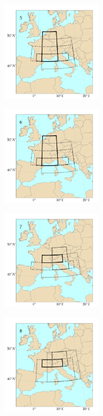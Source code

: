 \documentclass[5p]{elsarticle}
\begin{document}
\begin{figure}[htb]
\begin{subfigure}{.5\columnwidth}
	\end{subfigure}
	\begin{subfigure}{.5\columnwidth}
		\centering
		\includegraphics[width=4.2cm]{figures/spatial_win_z4/Spatial_windows_5.png}
	\end{subfigure}%
	\begin{subfigure}{.5\columnwidth}
		\centering
		\includegraphics[width=4.2cm]{figures/spatial_win_z4/Spatial_windows_6.png}
	\end{subfigure}
	\begin{subfigure}{.5\columnwidth}
		\centering
		\includegraphics[width=4.2cm]{figures/spatial_win_z4/Spatial_windows_7.png}
	\end{subfigure}%
	\begin{subfigure}{.5\columnwidth}
		\centering
		\includegraphics[width=4.2cm]{figures/spatial_win_z4/Spatial_windows_8.png}

\end{subfigure}
\end{figure}
\end{document}
